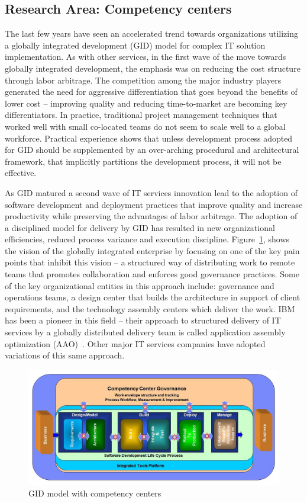 \subsection{Research Area: Competency centers}
The last few years have seen an accelerated trend towards organizations utilizing a globally integrated development (GID) model for complex IT solution implementation. As with other services, in the first wave of the move towards globally integrated development, the emphasis was on reducing the cost structure through labor arbitrage.  The competition among the major industry players generated the need for aggressive differentiation that goes beyond the benefits of lower cost -- improving quality and reducing time-to-market are becoming key differentiators. In practice, traditional project management techniques that worked well with small co-located teams do not seem to scale well to a global workforce. Practical experience shows that unless development process adopted for GID should be supplemented by an over-arching procedural and architectural framework, that implicitly partitions the development process, it will not be effective.

As GID matured a second wave of IT services innovation lead to the adoption of software development and deployment practices that improve quality and increase productivity while preserving the advantages of labor arbitrage.  The adoption of a disciplined model for delivery by GID has resulted in new organizational efficiencies, reduced process variance and execution discipline. Figure~\ref{glofig1}, shows the vision of the globally integrated enterprise by focusing on one of the key pain points that inhibit this vision -- a structured way of distributing work to remote teams that promotes collaboration and enforces good governance practices.  Some of the key organizational entities in this approach include: governance and operations teams, a design center that builds the architecture in support of client requirements, and the technology assembly centers which deliver the work. IBM has been a pioneer in this field -- their approach to structured delivery of IT services by a globally distributed delivery team is called application assembly optimization (AAO)~\cite{gloaao}. Other major IT services companies have adopted variations of this same approach.

\begin{figure}[h]
\includegraphics[scale=0.2]{figs/glocomp.jpg}
\caption{GID model with competency centers}
\label{glofig1}
\end{figure}

